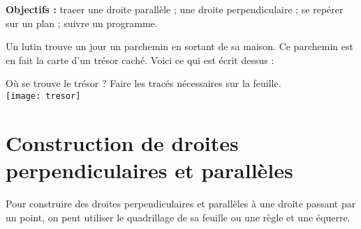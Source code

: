 \activites

   \begin{activite}
      {\bf Objectifs :} tracer une droite parallèle ; une droite perpendiculaire ; se repérer sur un plan ; suivre un programme.
      \begin{QCM}
         Un lutin trouve un jour un parchemin en sortant de sa maison.
Ce parchemin est en fait la carte d’un trésor caché. Voici ce qui est écrit dessus :
         \begin{center}
         \end{center}
         Où se trouve le trésor ? Faire les tracés nécessaires sur la feuille. \\ [3mm]
            \texttt{[image: tresor]}
      \end{QCM}
\end{activite}


\cours 

\section{Construction de droites perpendiculaires et parallèles}

Pour construire des droites perpendiculaires et parallèles à une droite passant par un point, on peut utiliser le quadrillage de sa feuille ou une règle et une équerre.

